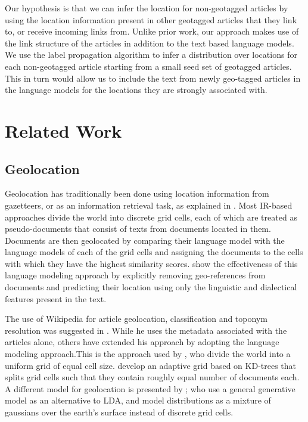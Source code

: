 \documentclass[11pt]{article}
\newcommand{\comment}[1]{}
\begin{document}
Our hypothesis is that we can infer the location for non-geotagged articles by using the location information present in other geotagged articles that they link to, or receive incoming links from. Unlike prior work, our approach makes use of the link structure of the articles in addition to the text based language models. We use the label propagation algorithm to infer a distribution over locations for each non-geotagged article starting from a small seed set of geotagged articles. This in turn would allow us to include the text from newly geo-tagged articles in the language models for the locations they are strongly associated with.

\section{Related Work}
\subsection{Geolocation}
Geolocation has traditionally been done \comment{improve this part} using location information from gazetteers, or as an information retrieval task, as explained in \cite{skiles:12}. Most IR-based approaches divide the world into discrete grid cells, each of which are treated as pseudo-documents that consist of texts from documents located in them. Documents are then geolocated by comparing their language model with the language models of each of the grid cells and assigning the documents to the cells with which they have the highest similarity scores. \cite{eisenstein-smith-xing:11} show the effectiveness of this language modeling approach by explicitly removing geo-references from documents and predicting their location using only the linguistic and dialectical features present in the text.

The use of Wikipedia for article geolocation, classification and toponym resolution was suggested in \cite{overell2009geographic}. While he uses the metadata associated with the articles alone, others have extended his approach by adopting the language modeling approach.This is the approach used by \cite{wing-baldridge:11}, who divide the world into a uniform grid of equal cell size. \cite{rolleretal:12} develop an adaptive grid based on KD-trees that splits grid cells such that they contain roughly equal number of documents each. A different model for geolocation is presented by \cite{eisensteinetal:11}; who use a general generative model as an alternative to LDA, and model distributions as a mixture of gaussians over the earth's surface instead of discrete grid cells. 
\end{document}
